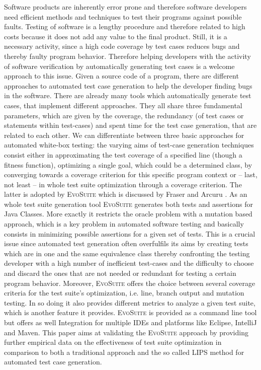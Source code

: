 \documentclass[pdftex,english,oribibl]{llncs}
\begin{document}
Software products are inherently error prone and therefore software developers need efficient methods and techniques to test their programs against possible faults. Testing of software is a lengthy procedure and therefore related to high costs because it does not add any value to the final product. Still, it is a necessary activity, since a high code coverage by test cases reduces bugs and thereby faulty program behavior. Therefore helping developers with the activity of software verification by automatically generating test cases is a welcome approach to this issue.
Given a source code of a program, there are different approaches to automated test case generation to help the developer finding bugs in the software. There are already many tools which automatically generate test cases, that implement different approaches. They all share three fundamental parameters, which are given by the coverage, the redundancy (of test cases or statements within test-cases) and spent time for the test case generation, that are related to each other. We can differentiate between three basic approaches for automated white-box testing: the varying aims of test-case generation techniques consist either in approximating the test coverage of a specified line (though a fitness function), optimizing a single goal, which could be a determined class, by converging towards a coverage criterion for this specific program context or -- last, not least -- in whole test suite optimization through a coverage criterion. 
The latter is adopted by \textsc{EvoSuite} which is discussed by Fraser and Arcuru \citet{fraser2011evosuite}.
As an whole test suite generation tool \textsc{EvoSuite} generates both tests and assertions for Java Classes. More exactly it restricts the oracle problem with a mutation based approach, which is a key problem in automated software testing and basically consists in minimizing possible assertions for a given set of tests. This is a crucial issue since automated test generation often overfulfils its aims by creating tests which are in one and the same equivalence class thereby confronting the testing developer with a high number of inefficient test-cases and the difficulty to choose and discard the ones that are not needed or redundant for testing a certain program behavior. Moreover, \textsc{EvoSuite} offers the choice between several coverage criteria for the test suite's optimization, i.e. line, branch output and mutation testing. In so doing it also provides different metrics to analyze a given test suite, which is another feature it provides. \textsc{EvoSuite} is provided as a command line tool but offers as well Integration for multiple IDEs and platforms like Eclipse, IntelliJ and Maven.
This paper aims at validating the \textsc{EvoSuite} approach by providing further empirical data on the effectiveness of test suite optimization in comparison to both a traditional approach and the so called LIPS method for automated test case generation.
\end{document}
